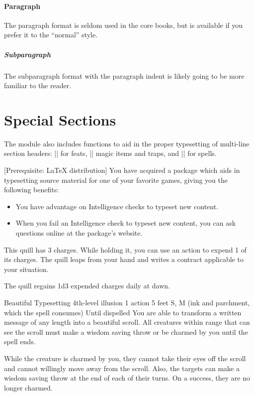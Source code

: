 \documentclass[letterpaper,twocolumn,openany,nodeprecatedcode,srd=5.1]{dndbook}
\begin{document}
\paragraph{Paragraph}
The paragraph format is seldom used in the core books, but is available if you prefer it to the ``normal'' style.

\subparagraph{Subparagraph}
The subparagraph format with the paragraph indent is likely going to be more familiar to the reader.

\section{Special Sections}
The module also includes functions to aid in the proper typesetting of multi-line section headers: |\DndFeatHeader| for feats, |\DndItemHeader| magic items and traps, and |\DndSpellHeader| for spells.

[Prerequisite: \LaTeX{} distribution]
You have acquired a package which aids in typesetting source material for one of your favorite games, giving you the following benefits:

\begin{itemize}
  \item You have advantage on Intelligence checks to typeset new content.
  \item When you fail an Intelligence check to typeset new content, you can ask questions online at the package's website.
\end{itemize}

This quill has 3 charges. While holding it, you can use an action to expend 1 of its charges. The quill leaps from your hand and writes a contract applicable to your situation.

The quill regains 1d3 expended charges daily at dawn.

\DndSpellHeader%
  {Beautiful Typesetting}
  {4th-level illusion}
  {1 action}
  {5 feet}
  {S, M (ink and parchment, which the spell consumes)}
  {Until dispelled}
You are able to transform a written message of any length into a beautiful scroll. All creatures within range that can see the scroll must make a wisdom saving throw or be charmed by you until the spell ends.

While the creature is charmed by you, they cannot take their eyes off the scroll and cannot willingly move away from the scroll. Also, the targets can make a wisdom saving throw at the end of each of their turns. On a success, they are no longer charmed.
\end{document}
